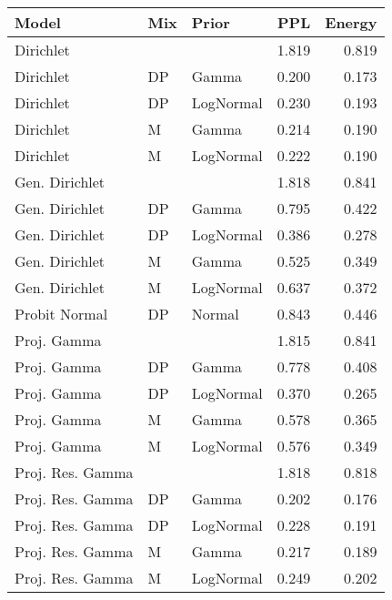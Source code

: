 \begin{table}[ht]
\centering
\begin{tabular}{lllrr}
  \hline
Model & Mix & Prior & PPL & Energy \\ 
  \hline
Dirichlet &  &  & 1.819 & 0.819 \\ 
  Dirichlet & DP & Gamma & 0.200 & 0.173 \\ 
  Dirichlet & DP & LogNormal & 0.230 & 0.193 \\ 
  Dirichlet & M & Gamma & 0.214 & 0.190 \\ 
  Dirichlet & M & LogNormal & 0.222 & 0.190 \\ 
  Gen. Dirichlet &  &  & 1.818 & 0.841 \\ 
  Gen. Dirichlet & DP & Gamma & 0.795 & 0.422 \\ 
  Gen. Dirichlet & DP & LogNormal & 0.386 & 0.278 \\ 
  Gen. Dirichlet & M & Gamma & 0.525 & 0.349 \\ 
  Gen. Dirichlet & M & LogNormal & 0.637 & 0.372 \\ 
  Probit Normal & DP & Normal & 0.843 & 0.446 \\ 
  Proj. Gamma &  &  & 1.815 & 0.841 \\ 
  Proj. Gamma & DP & Gamma & 0.778 & 0.408 \\ 
  Proj. Gamma & DP & LogNormal & 0.370 & 0.265 \\ 
  Proj. Gamma & M & Gamma & 0.578 & 0.365 \\ 
  Proj. Gamma & M & LogNormal & 0.576 & 0.349 \\ 
  Proj. Res. Gamma &  &  & 1.818 & 0.818 \\ 
  Proj. Res. Gamma & DP & Gamma & 0.202 & 0.176 \\ 
  Proj. Res. Gamma & DP & LogNormal & 0.228 & 0.191 \\ 
  Proj. Res. Gamma & M & Gamma & 0.217 & 0.189 \\ 
  Proj. Res. Gamma & M & LogNormal & 0.249 & 0.202 \\ 
   \hline
\end{tabular}
\label{tab:dev}
\end{table}
